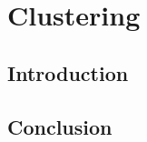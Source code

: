 \chapter{Clustering}
\minitoc
\thispagestyle{empty}
\newpage

\section{Introduction}

\section{Conclusion}


